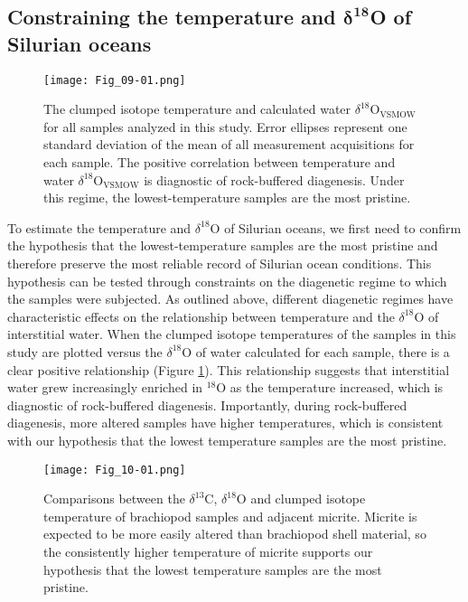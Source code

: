 \documentclass[5p, authoryear]{elsarticle}
\begin{document}
\subsection{Constraining the temperature and $\mathbf{\delta^{18}}$O of Silurian oceans} 

\begin{figure}[b]
\centering
\texttt{[image: Fig\_09-01.png]}
\caption{The clumped isotope temperature and calculated water $\delta^{18}$O$_{\text{VSMOW}}$ for all samples analyzed in this study. Error ellipses represent one standard deviation of the mean of all measurement acquisitions for each sample. The positive correlation between temperature and water $\delta^{18}$O$_{\text{VSMOW}}$ is diagnostic of rock-buffered diagenesis. Under this regime, the lowest-temperature samples are the most pristine.}
\label{ellipses}
\end{figure}

To estimate the temperature and $\delta^{18}$O of Silurian oceans, we first need to confirm the hypothesis that the lowest-temperature samples are the most pristine and therefore preserve the most reliable record of Silurian ocean conditions. This hypothesis can be tested through constraints on the diagenetic regime to which the samples were subjected. As outlined above, different diagenetic regimes have characteristic effects on the relationship between temperature and the $\delta^{18}$O of interstitial water. When the clumped isotope temperatures of the samples in this study are plotted versus the $\delta^{18}$O of water calculated for each sample, there is a clear positive relationship (Figure \ref{ellipses}). This relationship suggests that interstitial water grew increasingly enriched in $^{18}$O as the temperature increased, which is diagnostic of rock-buffered diagenesis. Importantly, during rock-buffered diagenesis, more altered samples have higher temperatures, which is consistent with our hypothesis that the lowest temperature samples are the most pristine.

\begin{figure}[b]
\centering
\texttt{[image: Fig\_10-01.png]}
\caption{Comparisons between the $\delta^{13}$C, $\delta^{18}$O and clumped isotope temperature of brachiopod samples and adjacent micrite. Micrite is expected to be more easily altered than brachiopod shell material, so the consistently higher temperature of micrite supports our hypothesis that the lowest temperature samples are the most pristine.}
\label{comparisons}
\end{figure}
\end{document}
